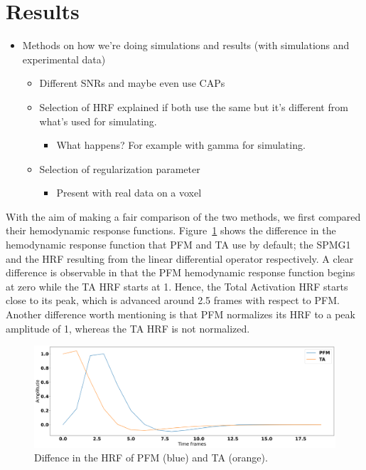 \section{Results}

\begin{itemize}
    \item Methods on how we're doing simulations and results (with simulations and experimental data)
    \begin{itemize}
        \item Different SNRs and maybe even use CAPs
        \item Selection of HRF explained if both use the same but it's different from what's used for simulating.
        \begin{itemize}
            \item What happens? For example with gamma for simulating.
        \end{itemize}
        \item Selection of regularization parameter
        \begin{itemize}
            \item Present with real data on a voxel
        \end{itemize}
    \end{itemize}
\end{itemize}

With the aim of making a fair comparison of the two methods, we first compared their hemodynamic response functions. Figure~\ref{fig:hrf_diff} shows the difference in the hemodynamic response function that PFM and TA use by default; the SPMG1 and the HRF resulting from the linear differential operator respectively. A clear difference is observable in that the PFM hemodynamic response function begins at zero while the TA HRF starts at 1. Hence, the Total Activation HRF starts close to its peak, which is advanced around 2.5 frames with respect to PFM. Another difference worth mentioning is that PFM normalizes its HRF to a peak amplitude of 1, whereas the TA HRF is not normalized.

\begin{figure}[h]
    \includegraphics[width=\columnwidth]{figures/hrf_diff.png}
    \caption{Diffence in the HRF of PFM (blue) and TA (orange).}
\label{fig:hrf_diff}
\end{figure}

